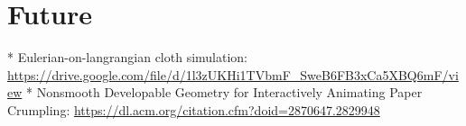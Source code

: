\chapter{Future}

* Eulerian-on-langrangian cloth simulation: \url{https://drive.google.com/file/d/1l3zUKHi1TVbmF_SweB6FB3xCa5XBQ6mF/view}
* Nonsmooth Developable Geometry for Interactively Animating Paper Crumpling: \url{https://dl.acm.org/citation.cfm?doid=2870647.2829948}

